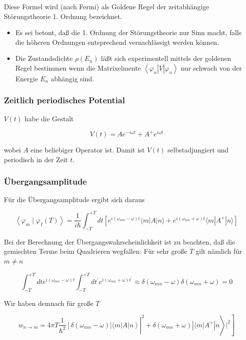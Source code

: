 \documentclass[10pt, letterpaper]{article}
\begin{document}
Diese Formel wird (nach Fermi) als Goldene Regel der zeitabhängige Störungstheorie 1. Ordnung bezeichnet.

\begin{itemize}
  \item Es sei betont, daß die 1. Ordnung der Störungstheorie nur Sinn macht, falls die höheren Ordnungen entsprechend vernachlässigt werden können.
  \item Die Zustandsdichte $\rho\left(E_{n}\right)$ läßt sich experimentell mittels der goldenen Regel bestimmen wenn die Matrixelmente $\left\langle\varphi_{n}\right| V\left|\varphi_{n}\right\rangle$ nur schwach von der Energie $E_{n}$ abhängig sind.
\end{itemize}

\subsubsection*{Zeitlich periodisches Potential}
$V(t)$ habe die Gestalt

$$
V(t)=A e^{-i \omega t}+A^{+} e^{i \omega t}
$$

wobei $A$ eine beliebiger Operator ist. Damit ist $V(t)$ selbstadjungiert und periodisch in der Zeit $t$.

\subsubsection*{Übergangsamplitude}
Für die Übergangsamplitude ergibt sich daraus

$$
\left\langle\varphi_{m} \mid \varphi_{I}(T)\right\rangle=\frac{1}{i \hbar} \int_{-T}^{+T} d t\left[e^{i\left(\omega_{m n}-\omega\right) t}\langle m| A|n\rangle+e^{i\left(\omega_{m n}+\omega\right) t}\langle m| A^{+}|n\rangle\right]
$$

Bei der Berechnung der Übergangswahrscheinlichkeit ist zu beachten, daß die gemischten Terme beim Quadrieren wegfallen: Für sehr große $T$ gilt nämlich für $m \neq n$

$$
\int_{-T}^{+T} d t e^{i\left(\omega_{m n}-\omega\right) t} \int_{-T}^{+T} d t^{\prime} e^{i\left(\omega_{m n}+\omega\right) t^{\prime}} \approx \delta\left(\omega_{m n}-\omega\right) \delta\left(\omega_{m n}+\omega\right)=0
$$

Wir haben demnach für große $T$

$$
\left.\left.w_{n \rightarrow m}=\left.4 \pi T \frac{1}{\hbar^{2}}\left[\delta\left(\omega_{m n}-\omega\right)|\langle m| A| n\right\rangle\right|^{2}+\delta\left(\omega_{m n}+\omega\right)\left|\langle m| A^{+}\right| n\right\rangle\left.\right|^{2}\right]
$$
\end{document}

